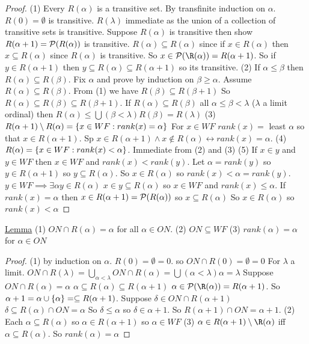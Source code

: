 \begin{proof}
(1) Every $R(\alpha)$ is a transitive set.
    By transfinite induction on $\alpha$.
    $R(0) = \emptyset$ is transitive.
    $R(\lambda)$ immediate as the union of a collection of transitive sets is transitive.
    Suppose $R(\alpha)$ is transitive then show $R(\alpha+1) = \mathcal{P}(R(\alpha))$ is transitive.
    $R(\alpha) \subseteq R(\alpha)$ since if $x \in R(\alpha)$ then $x \subseteq R(\alpha)$ since $R(\alpha)$ is transitive.
    So $x \in \PP(\R(\alpha)) = R(\alpha + 1)$.
    So if $y \in R(\alpha+1)$ then $y \subseteq R(\alpha) \subseteq R(\alpha+1)$ so its transitive.
(2) If $\alpha \leq \beta$ then $R(\alpha) \subseteq R(\beta)$.
    Fix $\alpha$ and prove by induction on $\beta \geq \alpha$.
    Assume $R(\alpha) \subseteq R(\beta)$.
    From (1) we have $R(\beta) \subseteq R(\beta+1)$
    So $R(\alpha) \subseteq R(\beta) \subseteq R(\beta+1)$.
    If $R(\alpha) \subseteq R(\beta)$ all $\alpha \leq \beta < \lambda$ ($\lambda$ a limit ordinal)
    then $R(\alpha) \leq \bigcup(\beta < \lambda) R(\beta) = R(\lambda)$
(3) $R(\alpha+1)\setminus R(\alpha) = \{x \in WF : rank(x) = \alpha\}$
    For $x \in WF$ $rank(x)=$ least $\alpha$ so that $x \in R(\alpha+1)$.
    Sp $x \in R(\alpha + 1) \wedge x \notin R(\alpha) \leftrightarrow rank(x) = \alpha$.
(4) $R(\alpha) = \{x \in WF : rank(x) < \alpha\}$.
    Immediate from (2) and (3)
(5) If $x \in y$ and $y \in WF$ then $x \in WF$ and $rank(x) < rank(y)$.
    Let $\alpha = rank(y)$ so $y \in R(\alpha+1)$ so $y \subseteq R(\alpha)$.
    So $x \in R(\alpha)$ so $rank(x) < \alpha = rank(y)$.
    $y \in WF \implies \exists \alpha y \in R(\alpha)$
    $x \in y \subseteq R(\alpha)$ so $x \in WF$ and $rank(x) \leq \alpha$.
    If $rank(x) = \alpha$ then $x \in R(\alpha+1) = \mathcal{P}(R(\alpha))$ so $x \subseteq R(\alpha)$
    So $x \in R(\alpha)$ so $rank(x) < \alpha$
    \end{proof}

   \underline{Lemma}
   (1) $ON \cap R(\alpha) = \alpha$ for all $\alpha \in ON$.
(2) $ON \subseteq WF$
(3) $rank(\alpha) = \alpha$ for $\alpha \in ON$

\begin{proof}
(1) by induction on $\alpha$.
    $R(0) = \emptyset = 0$.
    so $ON \cap R(0) = \emptyset = 0$
    For $\lambda$ a limit.
    $ON \cap R(\lambda) = \bigcup_{\alpha < \lambda} ON \cap R(\alpha) = \bigcup(\alpha < \lambda) \alpha = \lambda$
    Suppose $ON \cap R(\alpha) = \alpha$
    $\alpha \subseteq R(\alpha) \subseteq R(\alpha+1)$
    $\alpha \in \PP(\R(\alpha)) = R(\alpha+1)$.
    So $\alpha + 1 = \alpha \cup \{\alpha\} = \subseteq R(\alpha+1)$.
    Suppose $\delta \in ON \cap R(\alpha+1)$
    $\delta \subseteq R(\alpha) \cap ON = \alpha$
    So $\delta \leq \alpha$ so $\delta \in \alpha + 1$.
    So $R(\alpha + 1) \cap ON = \alpha + 1$.
(2) Each $\alpha \subseteq R(\alpha)$ so $\alpha \in R(\alpha + 1)$
    so $\alpha \in WF$
(3) $\alpha \in R(\alpha+1) \setminus \R(\alpha)$ iff $\alpha \subseteq R(\alpha)$.
    So $rank(\alpha) = \alpha$
    \end{proof}

